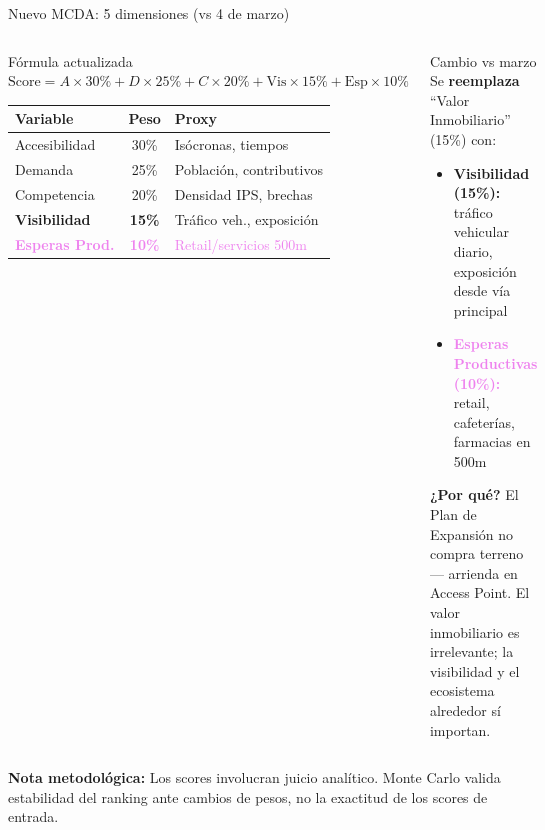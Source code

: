 \documentclass[aspectratio=169, 11pt]{beamer}
\begin{document}

\begin{frame}{Nuevo MCDA: 5 dimensiones (vs 4 de marzo)}

\begin{columns}[T]
\begin{block}{\small Fórmula actualizada}
\footnotesize
$\text{Score} = A \times 30\% + D \times 25\% + C \times 20\% + \text{Vis} \times 15\% + \text{Esp} \times 10\%$

\vspace{6pt}
\scriptsize
\begin{tabular}{@{}p{2.5cm}cp{3cm}@{}}
\toprule
\textbf{Variable} & \textbf{Peso} & \textbf{Proxy} \\
\midrule
\rowcolor{teal!8}
Accesibilidad & 30\% & Isócronas, tiempos \\
Demanda & 25\% & Población, contributivos \\
\rowcolor{teal!6}
Competencia & 20\% & Densidad IPS, brechas \\
\textcolor{rose}{\textbf{Visibilidad}} & \textcolor{rose}{\textbf{15\%}} & \textcolor{rose}{Tráfico veh., exposición} \\
\rowcolor{violet!8}
\textcolor{violet}{\textbf{Esperas Prod.}} & \textcolor{violet}{\textbf{10\%}} & \textcolor{violet}{Retail/servicios 500m} \\
\bottomrule
\end{tabular}
\end{block}

\begin{alertblock}{\small Cambio vs marzo}
\footnotesize
Se \textbf{reemplaza} ``Valor Inmobiliario'' (15\%) con:
\begin{itemize}\setlength{\itemsep}{2pt}
  \item \textcolor{rose}{\textbf{Visibilidad (15\%):}} tráfico vehicular diario, exposición desde vía principal
  \item \textcolor{violet}{\textbf{Esperas Productivas (10\%):}} retail, cafeterías, farmacias en 500m
\end{itemize}

\vspace{3pt}
\textbf{¿Por qué?} El Plan de Expansión no compra terreno --- arrienda en Access Point. El valor inmobiliario es irrelevante; la visibilidad y el ecosistema alrededor sí importan.
\end{alertblock}
\end{columns}

\vspace{2pt}
{\tiny\textcolor{slate}{\textbf{Nota metodológica:}} Los scores involucran juicio analítico. Monte Carlo valida estabilidad del ranking ante cambios de pesos, no la exactitud de los scores de entrada.}
\end{frame}
\end{document}
